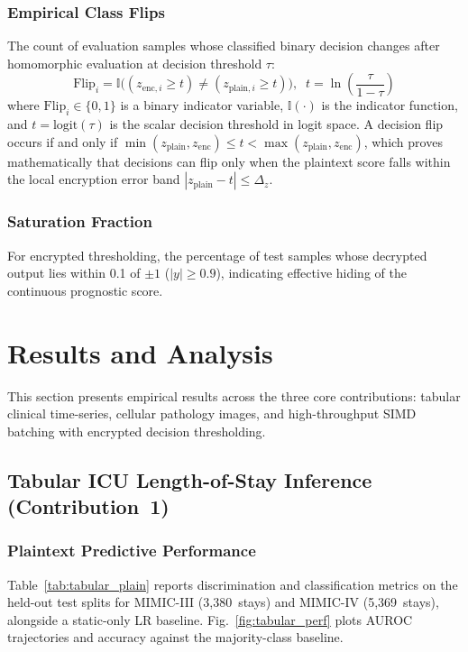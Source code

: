 \documentclass[conference]{IEEEtran}
\begin{document}
\subsubsection{Empirical Class Flips}
The count of evaluation samples whose classified binary decision changes after homomorphic evaluation at decision threshold $\tau$:
\begin{equation}
\mathrm{Flip}_i = \mathbb{I}\bigl((z_{\mathrm{enc},i} \geq t) \neq (z_{\mathrm{plain},i} \geq t)\bigr), \;\; t = \ln\!\left(\frac{\tau}{1-\tau}\right)
\label{eq:flips}
\end{equation}
where $\mathrm{Flip}_i \in \{0, 1\}$ is a binary indicator variable, $\mathbb{I}(\cdot)$ is the indicator function, and $t = \mathrm{logit}(\tau)$ is the scalar decision threshold in logit space. A decision flip occurs if and only if $\min(z_{\mathrm{plain}}, z_{\mathrm{enc}}) \leq t < \max(z_{\mathrm{plain}}, z_{\mathrm{enc}})$, which proves mathematically that decisions can flip only when the plaintext score falls within the local encryption error band $|z_{\mathrm{plain}} - t| \leq \Delta_z$.

\subsubsection{Saturation Fraction}
For encrypted thresholding, the percentage of test samples whose decrypted output lies within 0.1 of $\pm 1$ ($|y| \geq 0.9$), indicating effective hiding of the continuous prognostic score.

\section{Results and Analysis}\label{sec:results}

This section presents empirical results across the three core contributions: tabular clinical time-series, cellular pathology images, and high-throughput SIMD batching with encrypted decision thresholding.

\subsection{Tabular ICU Length-of-Stay Inference (Contribution~1)}

\subsubsection{Plaintext Predictive Performance}
Table~\ref{tab:tabular_plain} reports discrimination and classification metrics on the held-out test splits for MIMIC-III (3,380~stays) and MIMIC-IV (5,369~stays), alongside a static-only LR baseline. Fig.~\ref{fig:tabular_perf} plots AUROC trajectories and accuracy against the majority-class baseline.
\end{document}
